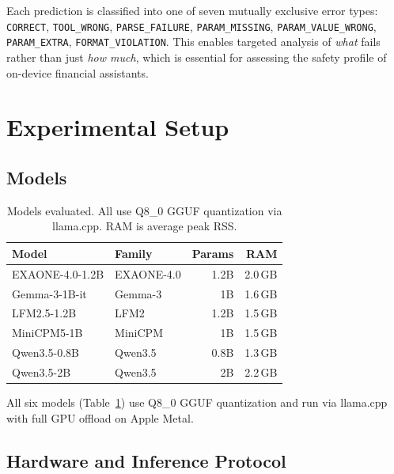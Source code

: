 \documentclass[11pt,twocolumn]{article}
\begin{document}
Each prediction is classified into one of seven mutually exclusive error types:
\texttt{CORRECT}, \texttt{TOOL\_WRONG}, \texttt{PARSE\_FAILURE}, \texttt{PARAM\_MISSING}, \texttt{PARAM\_VALUE\_WRONG}, \texttt{PARAM\_EXTRA}, \texttt{FORMAT\_VIOLATION}.
This enables targeted analysis of \emph{what} fails rather than just \emph{how much}, which is essential for assessing the safety profile of on-device financial assistants.

\section{Experimental Setup}

\subsection{Models}

\begin{table}[t]
\centering
\footnotesize
\setlength{\tabcolsep}{4pt}
\begin{tabular}{@{}p{2.8cm}p{2.0cm}rr@{}}
\toprule
\textbf{Model} & \textbf{Family} & \textbf{Params} & \textbf{RAM} \\
\midrule
EXAONE-4.0-1.2B & EXAONE-4.0 \citeyearpar{lgai2025exaone} & 1.2B & 2.0\,GB \\
Gemma-3-1B-it   & Gemma-3 \citeyearpar{team2025gemma}     & 1B   & 1.6\,GB \\
LFM2.5-1.2B     & LFM2 \citeyearpar{liquidai2025lfm2}     & 1.2B & 1.5\,GB \\
MiniCPM5-1B     & MiniCPM \citeyearpar{minicpm2024}       & 1B   & 1.5\,GB \\
Qwen3.5-0.8B    & Qwen3.5 \citeyearpar{qwen2025qwen3}    & 0.8B & 1.3\,GB \\
Qwen3.5-2B      & Qwen3.5 \citeyearpar{qwen2025qwen3}    & 2B   & 2.2\,GB \\
\bottomrule
\end{tabular}
\caption{Models evaluated. All use Q8\_0 GGUF quantization via llama.cpp. RAM is average peak RSS.}
\label{tab:models}
\end{table}

All six models (Table~\ref{tab:models}) use Q8\_0 GGUF quantization and run via llama.cpp \citep{llamacpp2023} with full GPU offload on Apple Metal.

\subsection{Hardware and Inference Protocol}
\end{document}
